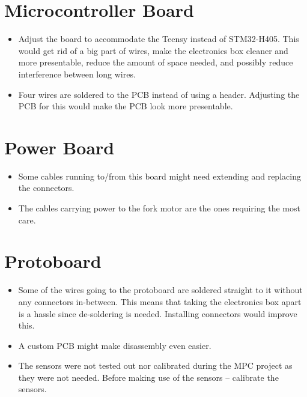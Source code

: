 \section{Microcontroller Board}
\begin{itemize}[noitemsep]
  \item Adjust the board to accommodate the Teensy instead of STM32-H405. This would get rid of a big part of wires, make the electronics box cleaner and more presentable, reduce the amount of space needed, and possibly reduce interference between long wires.
  \item Four wires are soldered to the PCB instead of using a header. Adjusting the PCB for this would make the PCB look more presentable.
\end{itemize}

\section{Power Board}
\begin{itemize}[noitemsep]
  \item Some cables running to/from this board might need extending and replacing the connectors.
  \item The cables carrying power to the fork motor are the ones requiring the most care.
\end{itemize}

\section{Protoboard}
\begin{itemize}[noitemsep]
  \item Some of the wires going to the protoboard are soldered straight to it without any connectors in-between. This means that taking the electronics box apart is a hassle since de-soldering is needed. Installing connectors would improve this.
  \item A custom PCB might make disassembly even easier.
  \item The sensors were not tested out nor calibrated during the MPC project as they were not needed. Before making use of the sensors -- calibrate the sensors.
\end{itemize}

